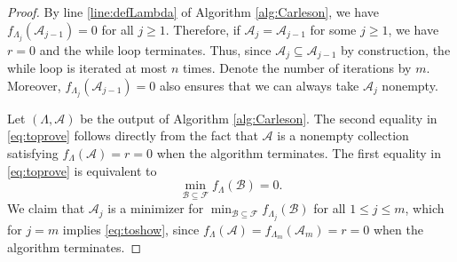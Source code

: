 \documentclass[a4paper, oneside,11pt]{amsart}
\theoremstyle{definition}
\theoremstyle{remark}
\numberwithin{equation}{section}
\newcommand{\mc}{\mathcal}
\begin{document}
\begin{proof}
By line \ref{line:defLambda} of  Algorithm \ref{alg:Carleson}, we have  $f_{\Lambda_{j}}(\mc{A}_{j-1})=0$ for all $j\geq 1$.  Therefore, if $\mc{A}_{j}=\mc{A}_{j-1}$ for some $j\geq 1$, we have $r=0$ and the while loop terminates. Thus, since $\mc{A}_{j} \subseteq \mc{A}_{j-1}$ by construction, the while loop is iterated at most $n$ times. Denote the number of iterations by $m$. Moreover, $f_{\Lambda_{j}}(\mc{A}_{j-1})=0$ also ensures that we can always take $\mc{A}_j$ nonempty.

Let $(\Lambda,\mc{A})$ be the output of  Algorithm \ref{alg:Carleson}. The second equality in \eqref{eq:toprove} follows directly from the fact  that $\mc{A}$ is a nonempty collection satisfying $f_{\Lambda}(\mc{A}) = r =0$  when the algorithm terminates. The first equality in \eqref{eq:toprove} is equivalent to
\begin{equation}\label{eq:toshow}
  \min_{\mc{B}\subseteq \mc{F}} f_{\Lambda}(\mc{B}) = 0.
\end{equation}
We claim that $\mc{A}_j$ is a minimizer for $\min_{\mc{B}\subseteq \mc{F}} f_{\Lambda_{j}}(\mc{B})$ for all $1\leq j \leq m$, which for $j=m$ implies \eqref{eq:toshow}, since $f_{\Lambda}(\mc{A}) =f_{\Lambda_m}(\mc{A}_m) = r =0$ when the algorithm terminates.


\end{proof}
\end{document}
